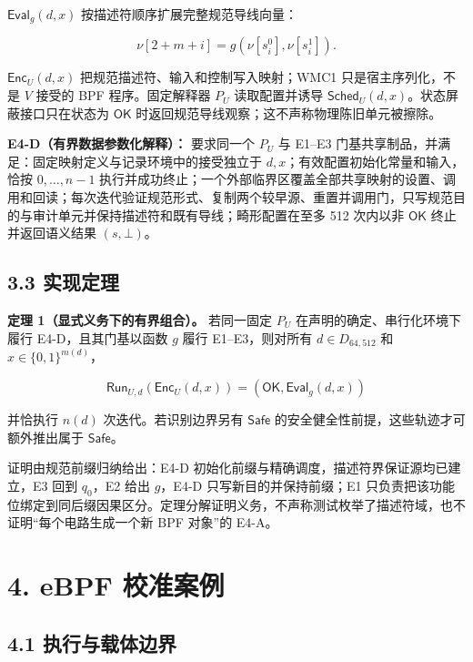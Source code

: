 \documentclass[
  11pt,
  a4paper,
]{ctexart}
\begin{document}
\(\mathsf{Eval}_g(d,x)\) 按描述符顺序扩展完整规范导线向量：

\[\nu[2+m+i]=g(\nu[s_i^0],\nu[s_i^1]).\]

\(\mathsf{Enc}_U(d,x)\) 把规范描述符、输入和控制写入映射；WMC1
只是宿主序列化，不是 \(V\) 接受的 BPF 程序。固定解释器 \(P_U\)
读取配置并诱导 \(\mathsf{Sched}_U(d,x)\)。状态屏蔽接口只在状态为
\(\mathsf{OK}\) 时返回规范导线观察；这不声称物理陈旧单元被擦除。

\textbf{E4-D（有界数据参数化解释）：} 要求同一个 \(P_U\) 与 E1--E3
门基共享制品，并满足：固定映射定义与记录环境中的接受独立于
\(d,x\)；有效配置初始化常量和输入，恰按 \(0,\ldots,n-1\)
执行并成功终止；一个外部临界区覆盖全部共享映射的设置、调用和回读；每次迭代验证规范形式、复制两个较早源、重置并调用门，只写规范目的与审计单元并保持描述符和既有导线；畸形配置在至多
512 次内以非 \(\mathsf{OK}\) 终止并返回语义结果 \((s,\bot)\)。

\hypertarget{33-ux5b9eux73b0ux5b9aux7406}{%
\subsection{3.3 实现定理}\label{33-ux5b9eux73b0ux5b9aux7406}}

\textbf{定理 1（显式义务下的有界组合）。} 若同一固定 \(P_U\)
在声明的确定、串行化环境下履行 E4-D，且其门基以函数 \(g\) 履行
E1--E3，则对所有 \(d\in D_{64,512}\) 和 \(x\in\{0,1\}^{m(d)}\)，

\[\mathsf{Run}_{U,d}(\mathsf{Enc}_U(d,x))
=(\mathsf{OK},\mathsf{Eval}_g(d,x))\]

并恰执行 \(n(d)\) 次迭代。若识别边界另有 \(\mathsf{Safe}\)
的安全健全性前提，这些轨迹才可额外推出属于 \(\mathsf{Safe}\)。

证明由规范前缀归纳给出：E4-D
初始化前缀与精确调度，描述符界保证源均已建立，E3 回到 \(q_0\)，E2 给出
\(g\)，E4-D 只写新目的并保持前缀；E1
只负责把该功能位绑定到同后缀因果区分。定理分解证明义务，不声称测试枚举了描述符域，也不证明``每个电路生成一个新
BPF 对象''的 E4-A。

\hypertarget{4-ebpf-ux6821ux51c6ux6848ux4f8b}{%
\section{4. eBPF 校准案例}\label{4-ebpf-ux6821ux51c6ux6848ux4f8b}}

\hypertarget{41-ux6267ux884cux4e0eux8f7dux4f53ux8fb9ux754c}{%
\subsection{4.1
执行与载体边界}\label{41-ux6267ux884cux4e0eux8f7dux4f53ux8fb9ux754c}}
\end{document}

